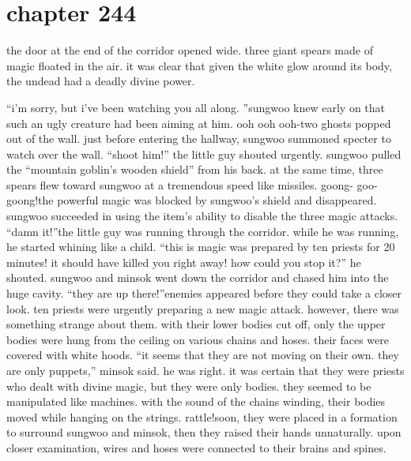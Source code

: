 \section{chapter 244}

                            the door at the end of the corridor opened wide.
 three giant spears made of magic floated in the air.
 it was clear that given the white glow around its body, the undead had a deadly divine power.





“i’m sorry, but i’ve been watching you all along.
”sungwoo knew early on that such an ugly creature had been aiming at him.
ooh ooh ooh-two ghosts popped out of the wall.
 just before entering the hallway, sungwoo summoned specter to watch over the wall.
“shoot him!” the little guy shouted urgently.
sungwoo pulled the “mountain goblin’s wooden shield” from his back.
 at the same time, three spears flew toward sungwoo at a tremendous speed like missiles.
goong- goo-goong!the powerful magic was blocked by sungwoo’s shield and disappeared.
 sungwoo succeeded in using the item’s ability to disable the three magic attacks.
“damn it!”the little guy was running through the corridor.
 while he was running, he started whining like a child.
“this is magic was prepared by ten priests for 20 minutes! it should have killed you right away! how could you stop it?” he shouted.
sungwoo and minsok went down the corridor and chased him into the huge cavity.
“they are up there!”enemies appeared before they could take a closer look.
 ten priests were urgently preparing a new magic attack.
 however, there was something strange about them.
with their lower bodies cut off, only the upper bodies were hung from the ceiling on various chains and hoses.
 their faces were covered with white hoods.
“it seems that they are not moving on their own.
 they are only puppets,” minsok said.
he was right.
 it was certain that they were priests who dealt with divine magic, but they were only bodies.
 they seemed to be manipulated like machines.
with the sound of the chains winding, their bodies moved while hanging on the strings.
rattle!soon, they were placed in a formation to surround sungwoo and minsok, then they raised their hands unnaturally.
 upon closer examination, wires and hoses were connected to their brains and spines.

